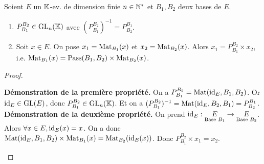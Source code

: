 \documentclass[12pt, a4paper]{report}
\begin{document}
\begin{property}
    Soient $E$ un $\mathbb{K}$-ev. de dimension finie $n \in \mathbb{N}^*$ et $B_1, B_2$ deux bases de $E$.
    \begin{enumerate}
        \item $P_{B_1}^{B_2} \in \mathrm{GL}_n(\mathbb{K})$ avec $(P_{B_1}^{B_2})^{-1} = P_{B_2}^{B_1}$.
        \item Soit $x \in E$. On pose $x_1 = \mathrm{Mat}_{B_1}(x)$ et $x_2 = \mathrm{Mat}_{B_2}(x)$. Alors $x_1 = P_{B_1}^{B_2} \times x_2$, i.e. $\mathrm{Mat}_{B_1}(x) = \mathrm{Pass}(B_1,B_2) \times \mathrm{Mat}_{B_2}(x)$.
    \end{enumerate}
\end{property}

\begin{proof}
    \begin{outline}
        \1 \textbf{Démonstration de la première propriété.}
        \2 On a $P_{B_1}^{B_2} = \mathrm{Mat}(\mathrm{id}_E, B_1, B_2)$.
        \2 Or $\mathrm{id}_E \in \mathrm{GL}(E)$, donc $P_{B_1}^{B_2} \in \mathrm{GL}_n(\mathbb{K})$.
        \2 Et on a $(P_{B_1}^{B_2})^{-1} = \mathrm{Mat}(\mathrm{id}_E, B_2, B_1) = P_{B_2}^{B_1}$.
        \1 \textbf{Démonstration de la deuxième propriété.}
        \2 On prend $\mathrm{id}_E : \underset{\text{Base }B_1}{E} \to \underset{\text{Base }B_2}{E}$.
        \2 Alors $\forall x \in E, \mathrm{id}_E(x) = x$. On a donc $\mathrm{Mat}(\mathrm{id}_E, B_1, B_2) \times \mathrm{Mat}_{B_1}(x) = \mathrm{Mat}_{B_2}(\mathrm{id}_E(x))$.
        \2 Donc $P_{B_1}^{B_2} \times x_1 = x_2$.
    \end{outline}
\end{proof}
\end{document}
